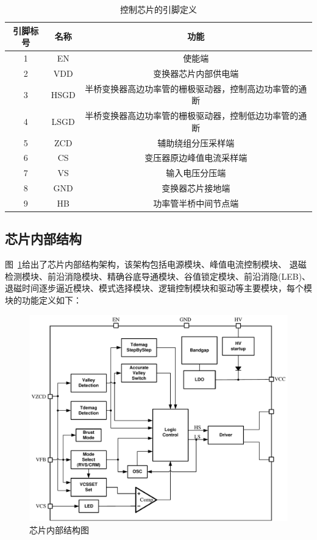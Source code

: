 \begin{table}[htbp]
    \caption{控制芯片的引脚定义}
    \label{tab:控制芯片的引脚定义}
    \centering
    \belowrulesep=0pt  %
    \aboverulesep=0pt  %
        \begin{tabular}{c|c|c}
            \toprule
            引脚标号 & 名称 & 功能  \\
            \midrule
            1 & EN   & 使能端                                              \\  \midrule
            2 & VDD  & 变换器芯片内部供电端                                 \\  \midrule
            3 & HSGD & 半桥变换器高边功率管的栅极驱动器，控制高边功率管的通断  \\\midrule  
            4 & LSGD & 半桥变换器高边功率管的栅极驱动器，控制低边功率管的通断  \\\midrule  
            5 & ZCD  & 辅助绕组分压采样端                                    \\  \midrule
            6 & CS   & 变压器原边峰值电流采样端                               \\ \midrule
            7 & VS   & 输入电压分压端                                        \\  \midrule
            8 & GND  & 变换器芯片接地端                                      \\  \midrule
            9 & HB   & 功率管半桥中间节点端                                   \\ 
              
            \bottomrule
        \end{tabular}
\end{table}

\subsection{芯片内部结构}
图~\ref{fig:芯片内部结构图}给出了芯片内部结构架构，该架构包括电源模块、峰值电流控制模块、 退磁检测模块、前沿消隐模块、精确谷底导通模块、谷值锁定模块、前沿消隐(LEB)、退磁时间逐步逼近模块、模式选择模块、逻辑控制模块和驱动等主要模块，每个模块的功能定义如下：

\begin{figure}[htbp] 
    \centering
    \includegraphics[width=0.8\linewidth]{figures/芯片内部结构图.pdf}
    \caption{芯片内部结构图}
    \label{fig:芯片内部结构图}
\end{figure}

